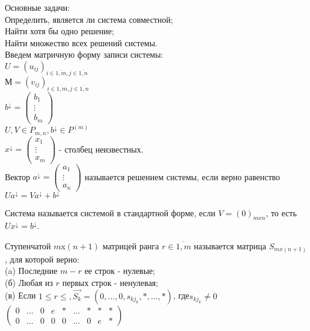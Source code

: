 Основные задачи: \\
  Определить, является ли система совместной; \\
  Найти хотя бы одно решение; \\
  Найти множество всех решений системы. \\

Введем матричную форму записи системы: \\
$U = (u_{ij})_{i \in \overline{1, m}, j \in \overline{1, n}}$ \\
$М = (v_{ij})_{i \in \overline{1, m}, j \in \overline{1, n}}$ \\
$b^\downarrow = \begin{pmatrix} b_1 \\ \vdots \\ b_m \end{pmatrix}$ \\
$U, V \in P_{m,n}, b^\downarrow \in P^{(m)}$ \\
$x^\downarrow = \begin{pmatrix} x_1 \\ \vdots \\ x_m \end{pmatrix}$ - столбец неизвестных. \\

Вектор $a^\downarrow = \begin{pmatrix}a_1 \\ \vdots \\ a_n \end{pmatrix}$ называется
решением системы, если верно равенство $Ua^\downarrow = Va^\downarrow + b^\downarrow$

\begin{defs}
  Система называется системой в стандартной форме, если $V = (0)_{mxn}$, то есть $Ux^\downarrow = b^\downarrow$.
\end{defs}

Ступенчатой $m$x$(n+1)$ матрицей ранга $r \in \overline{1, m}$ называется
матрица $S_{mx(n+1)}$, для которой верно: \\
(a) Последние $m-r$ ее строк - нулевые; \\
(б) Любая из $r$ первых строк - ненулевая; \\
(в) Если $1 \leqslant r \leqslant, \overrightarrow{S_k} = (0, \ldots, 0, s_{kj_k}, *, \ldots, *)$, где$s_{kj_k} \neq 0$\\
$\begin{pmatrix}
    0 & \ldots & 0 & e & * & \ldots & * & * & * \\
    0 & \ldots & 0 & 0 & 0 & \ldots & 0 & e & *
\end{pmatrix}$
